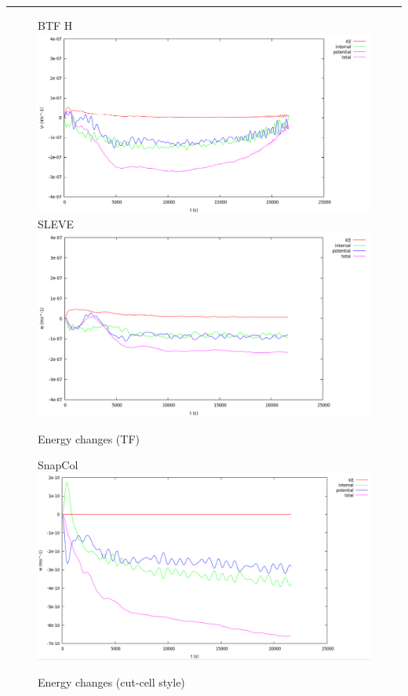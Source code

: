

\hrule

\begin{figure}
BTF H
\includegraphics[width=\textwidth]{interim-results/restingBtfHEnergy.png}
SLEVE
\includegraphics[width=\textwidth]{interim-results/restingSleveEnergy.png}
\caption{Energy changes (TF)}
\label{fig:rest:energy-tf}
\end{figure}

\begin{figure}
SnapCol
\includegraphics[width=\textwidth]{interim-results/restingSnapColEnergy.png}
\caption{Energy changes (cut-cell style)}
\label{fig:rest:energy-cut-cell}
\end{figure}
